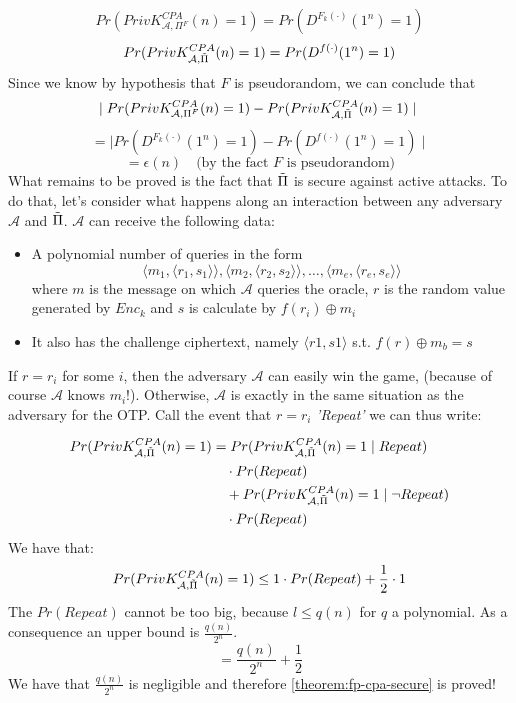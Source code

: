 \documentclass[../main]{subfiles}
\begin{document}
$$Pr(PrivK^{CPA}_{\mathcal{A}, \Pi{}^F}(n) = 1) = Pr(D^{F_k(\cdot{})}(1^n) = 1)$$
$$Pr(PrivK^{CPA}_{\mathcal{A}, \Tilde{\Pi{}}}(n) = 1) = Pr(D^{f(\cdot{})}(1^n) = 1)$$
Since we know by hypothesis that $F$ is pseudorandom, we can conclude that $$\mid{} Pr(PrivK^{CPA}_{\mathcal{A}, \Pi{}^F}(n) = 1) - Pr(PrivK^{CPA}_{\mathcal{A}, \Tilde{\Pi{}}}(n) = 1) \mid{}$$
$$= \mid{} Pr(D^{F_k(\cdot{})}(1^n) = 1) - Pr(D^{f(\cdot{})}(1^n) = 1) \mid{}$$
$$= \epsilon(n) \quad \text{(by the fact $F$ is pseudorandom)}$$
What remains to be proved is the fact that $\Tilde{\Pi{}}$ is secure against active attacks.
To do that, let's consider what happens along an interaction between any adversary $\mathcal{A}$ and $\Tilde{\Pi{}}$. $\mathcal{A}$ can receive the following data:
\begin{itemize}
    \item A polynomial number of queries in the form $$\langle{} m_1, \langle{} r_1, s_1 \rangle{} \rangle{}, \langle{} m_2, \langle{} r_2, s_2 \rangle{} \rangle{}, \ldots{}, \langle{} m_e, \langle{} r_e, s_e \rangle{} \rangle{}$$ where $m$ is the message on which $\mathcal{A}$ queries the oracle, $r$ is the random value generated by $Enc_k$ and $s$ is calculate by $f(r_i) \oplus{} m_i$
    \item It also has the challenge ciphertext, namely $\langle{} r1, s1 \rangle{}$ s.t. $f(r) \oplus{} m_b = s$
\end{itemize}
If $r=r_i$ for some $i$, then the adversary $\mathcal{A}$ can easily win the game, (because of course $\mathcal{A}$ knows $m_i$!).
Otherwise, $\mathcal{A}$ is exactly in the same situation as the adversary for the OTP.
\newpage
Call the event that $r=r_i$ \textit{'Repeat'} we can thus write:

\begin{equation*}
    \begin{split}
        Pr(PrivK^{CPA}_{\mathcal{A}, \Tilde{\Pi{}}}(n) = 1) &= Pr(PrivK^{CPA}_{\mathcal{A}, \Tilde{\Pi{}}}(n) = 1 \mid{} Repeat)\\
        &\quad{} \cdot{} Pr(Repeat) \\
        &\quad{} + Pr(PrivK^{CPA}_{\mathcal{A}, \Tilde{\Pi{}}}(n) = 1 \mid{} \neg{} Repeat) \\
        &\quad{} \cdot{} Pr(Repeat)
    \end{split}
\end{equation*}
\noindent
We have that:
$$Pr(PrivK^{CPA}_{\mathcal{A}, \Tilde{\Pi{}}}(n) = 1) \leq{} 1 \cdot{} Pr(Repeat) + \frac{1}{2} \cdot{} 1 $$
The $Pr(Repeat)$ cannot be too big, because $\mathbb{}{l} \leq{} q(n)$ for $q$ a polynomial. As a consequence an upper bound is $\frac{q(n)}{2^n}$.
$$= \frac{q(n)}{2^n} + \frac{1}{2}$$
We have that $ \frac{q(n)}{2^n} $ is negligible and therefore \ref{theorem:fp-cpa-secure} is proved!
\end{document}
